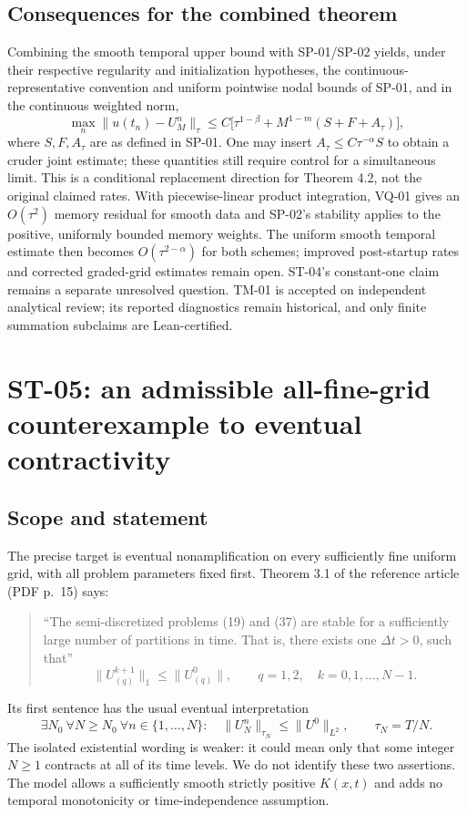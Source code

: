 \documentclass[11pt,a4paper]{amsart}
\theoremstyle{remark}
\theoremstyle{plain}
\theoremstyle{remark}
\numberwithin{equation}{section}
\begin{document}
\subsection{Consequences for the combined theorem}
Combining the smooth temporal upper bound with SP-01/SP-02 yields, under their respective regularity and initialization hypotheses, the continuous-representative convention and uniform pointwise nodal bounds of SP-01, and in the continuous weighted norm,
\[
 \max_n\|u(t_n)-U_M^n\|_\tau
 \le C\big[\tau^{1-\beta}+M^{1-m}(S+F+A_\tau)\big],
\]
where $S,F,A_\tau$ are as defined in SP-01. One may insert $A_\tau\le C\tau^{-\alpha}S$ to obtain a cruder joint estimate; these quantities still require control for a simultaneous limit. This is a conditional replacement direction for Theorem 4.2, not the original claimed rates. With piecewise-linear product integration, VQ-01 gives an $O(\tau^2)$ memory residual for smooth data and SP-02's stability applies to the positive, uniformly bounded memory weights. The uniform smooth temporal estimate then becomes $O(\tau^{2-\alpha})$ for both schemes; improved post-startup rates and corrected graded-grid estimates remain open. ST-04's constant-one claim remains a separate unresolved question. TM-01 is accepted on independent analytical review; its reported diagnostics remain historical, and only finite summation subclaims are Lean-certified.


\section{ST-05: an admissible all-fine-grid counterexample to eventual contractivity}
\label{sec:st05}

\subsection{Scope and statement}
The precise target is eventual nonamplification on every sufficiently fine uniform grid, with all problem parameters fixed first. Theorem 3.1 of the reference article (PDF p.~15) says:
\begin{quote}
``The semi-discretized problems (19) and (37) are stable for a sufficiently large number of partitions in time. That is, there exists one $\Delta t>0$, such that''
\[
 \|U_{(q)}^{k+1}\|_1\le\|U_{(q)}^0\|,
 \qquad q=1,2,\quad k=0,1,\ldots,N-1.
\]
\end{quote}
Its first sentence has the usual eventual interpretation
\[
 \exists N_0\ \forall N\ge N_0\ \forall n\in\{1,\ldots,N\}:\quad
 \|U_N^n\|_{\tau_N}\le\|U^0\|_{L^2},\qquad\tau_N=T/N.
\]
The isolated existential wording is weaker: it could mean only that some integer $N\ge1$ contracts at all of its time levels. We do not identify these two assertions. The model allows a sufficiently smooth strictly positive $K(x,t)$ and adds no temporal monotonicity or time-independence assumption.
\end{document}
